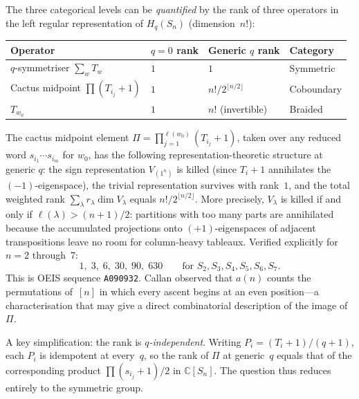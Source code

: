 \begin{remark}
\label{rem:rank-hierarchy}
The three categorical levels can be \emph{quantified} by the rank of
three operators in the left regular representation of $H_q(S_n)$
(dimension~$n!$):
\begin{center}
\renewcommand{\arraystretch}{1.3}
\small
\begin{tabular}{llll}
\toprule
\textbf{Operator} & \textbf{$q=0$ rank} & \textbf{Generic $q$ rank}
  & \textbf{Category} \\
\midrule
$q$-symmetriser $\sum_w T_w$ & $1$ & $1$ & Symmetric \\
Cactus midpoint $\prod(T_{i_j}+1)$ & $1$ & $n!/2^{\lfloor n/2 \rfloor}$ & Coboundary \\
$T_{w_0}$ & $1$ & $n!$ (invertible) & Braided \\
\bottomrule
\end{tabular}
\end{center}
The cactus midpoint element $\Pi = \prod_{j=1}^{\ell(w_0)} (T_{i_j} + 1)$,
taken over any reduced word $s_{i_1} \cdots s_{i_m}$ for $w_0$, has the
following representation-theoretic structure at generic $q$: the sign
representation $V_{(1^n)}$ is killed (since $T_i + 1$ annihilates the
$(-1)$-eigenspace), the trivial representation survives with rank~$1$,
and the total weighted rank $\sum_\lambda r_\lambda \dim V_\lambda$ equals
$n!/2^{\lfloor n/2 \rfloor}$.  More precisely, $V_\lambda$ is killed if
and only if $\ell(\lambda) > (n+1)/2$: partitions with too many parts
are annihilated because the accumulated projections onto $(+1)$-eigenspaces
of adjacent transpositions leave no room for column-heavy tableaux.  Verified explicitly for $n = 2$ through~$7$:
\[
  1, \; 3, \; 6, \; 30, \; 90, \; 630
  \qquad\text{for }S_2, S_3, S_4, S_5, S_6, S_7.
\]
This is OEIS sequence \texttt{A090932}.  Callan observed that $a(n)$ counts
the permutations of~$[n]$ in which every ascent begins at an even
position---a characterisation that may give a direct combinatorial
description of the image of~$\Pi$.

A key simplification: the rank is \emph{$q$-independent}.  Writing
$P_i = (T_i + 1)/(q + 1)$, each $P_i$ is idempotent at every~$q$, so
the rank of $\Pi$ at generic~$q$ equals that of the corresponding
product $\prod(s_{i_j} + 1)/2$ in $\mathbb{C}[S_n]$.  The question thus
reduces entirely to the symmetric group.


\end{remark}
